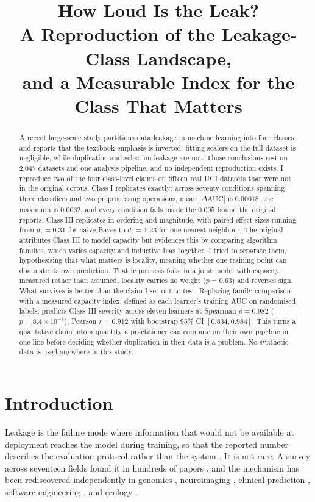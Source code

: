 \documentclass[10pt,twocolumn]{article}
\title{\vspace{-1.6em}\Large How Loud Is the Leak?\\
A Reproduction of the Leakage-Class Landscape,\\
and a Measurable Index for the Class That Matters\vspace{-0.6em}}
\author{}
\date{}
\begin{document}
\maketitle
\vspace{-3.2em}

\begin{abstract}
\noindent
A recent large-scale study partitions data leakage in machine learning into four
classes and reports that the textbook emphasis is inverted: fitting scalers on
the full dataset is negligible, while duplication and selection leakage are not.
Those conclusions rest on 2{,}047 datasets and one analysis pipeline, and no
independent reproduction exists. I reproduce two of the four class-level claims
on fifteen real UCI datasets that were not in the original corpus. Class I
replicates exactly: across seventy conditions spanning three classifiers and two
preprocessing operations, mean $|\Delta\mathrm{AUC}|$ is $0.00018$, the maximum is
$0.0032$, and every condition falls inside the $0.005$ bound the original
reports. Class III replicates in ordering and magnitude, with paired effect sizes
running from $d_z = 0.31$ for naive Bayes to $d_z = 1.23$ for one-nearest-neighbour.
The original attributes Class III to model capacity but evidences this by
comparing algorithm families, which varies capacity and inductive bias together.
I tried to separate them, hypothesising that what matters is locality, meaning
whether one training point can dominate its own prediction. That hypothesis
fails: in a joint model with capacity measured rather than assumed, locality
carries no weight ($p = 0.63$) and reverses sign. What survives is better than
the claim I set out to test. Replacing family comparison with a measured
capacity index, defined as each learner's training AUC on randomised labels,
predicts Class III severity across eleven learners at Spearman
$\rho = 0.982$ ($p = 8.4 \times 10^{-8}$), Pearson $r = 0.912$ with bootstrap
95\% CI $[0.834, 0.984]$. This turns a qualitative claim into a quantity a
practitioner can compute on their own pipeline in one line before deciding
whether duplication in their data is a problem. No synthetic data is used
anywhere in this study.
\end{abstract}

\section{Introduction}

Leakage is the failure mode where information that would not be available at
deployment reaches the model during training, so that the reported number
describes the evaluation protocol rather than the system
\cite{kaufman2012,kapoor2023}. It is not rare. A survey across seventeen fields
found it in hundreds of papers \cite{kapoor2023}, and the mechanism has been
rediscovered independently in genomics \cite{ambroise2002,simon2003},
neuroimaging \cite{varoquaux2018}, clinical prediction
\cite{mcdermott2021,beam2020}, software engineering \cite{alomar2025}, and
ecology \cite{roberts2017}.
\end{document}
